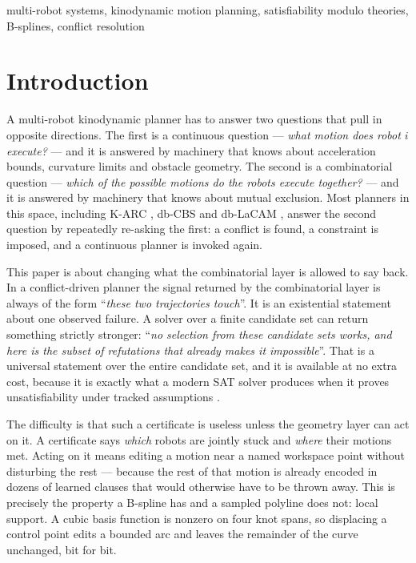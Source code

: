 \documentclass[conference]{IEEEtran}
\begin{document}
\begin{IEEEkeywords}
multi-robot systems, kinodynamic motion planning, satisfiability modulo theories,
B-splines, conflict resolution
\end{IEEEkeywords}

\section{Introduction}

A multi-robot kinodynamic planner has to answer two questions that pull in opposite
directions. The first is a continuous question --- \emph{what motion does robot $i$
execute?} --- and it is answered by machinery that knows about acceleration bounds,
curvature limits and obstacle geometry. The second is a combinatorial question ---
\emph{which of the possible motions do the robots execute together?} --- and it is answered
by machinery that knows about mutual exclusion. Most planners in this space, including
K-ARC \cite{karc2025}, db-CBS \cite{dbcbs2024} and db-LaCAM \cite{dblacam2025}, answer the
second question by repeatedly re-asking the first: a conflict is found, a constraint is
imposed, and a continuous planner is invoked again.

This paper is about changing what the combinatorial layer is allowed to say back. In a
conflict-driven planner the signal returned by the combinatorial layer is always of the
form ``\emph{these two trajectories touch}''. It is an existential statement about one
observed failure. A solver over a finite candidate set can return something strictly
stronger: ``\emph{no selection from these candidate sets works, and here is the subset of
refutations that already makes it impossible}''. That is a universal statement over the
entire candidate set, and it is available at no extra cost, because it is exactly what a
modern SAT solver produces when it proves unsatisfiability under tracked assumptions
\cite{z3}.

The difficulty is that such a certificate is useless unless the geometry layer can act on
it. A certificate says \emph{which} robots are jointly stuck and \emph{where} their motions
met. Acting on it means editing a motion near a named workspace point without disturbing
the rest --- because the rest of that motion is already encoded in dozens of learned
clauses that would otherwise have to be thrown away. This is precisely the property a
B-spline has and a sampled polyline does not: local support. A cubic basis function is
nonzero on four knot spans, so displacing a control point edits a bounded arc and leaves
the remainder of the curve unchanged, bit for bit.
\end{document}
